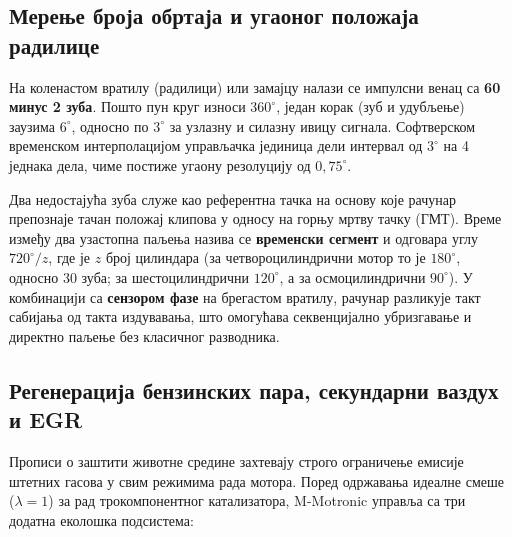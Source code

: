 \documentclass[12pt]{article}
\begin{document}
\subsection{Мерење броја обртаја и угаоног положаја радилице}

На коленастом вратилу (радилици) или замајцу налази се импулсни венац са
\textbf{60 минус 2 зуба}. Пошто пун круг износи $360^\circ$, један корак
(зуб и удубљење) заузима $6^\circ$, односно по $3^\circ$ за узлазну и силазну
ивицу сигнала. Софтверском временском интерполацијом управљачка јединица
дели интервал од $3^\circ$ на 4 једнака дела, чиме постиже угаону резолуцију
од $0,75^\circ$.

Два недостајућа зуба служе као референтна тачка на основу које рачунар
препознаје тачан положај клипова у односу на горњу мртву тачку (ГМТ). Време
између два узастопна паљења назива се \textbf{временски сегмент} и одговара
углу $720^\circ / z$, где је $z$ број цилиндара (за четвороцилиндрични мотор
то је $180^\circ$, односно 30 зуба; за шестоцилиндрични $120^\circ$, а за
осмоцилиндрични $90^\circ$). У комбинацији са \textbf{сензором фазе} на
брегастом вратилу, рачунар разликује такт сабијања од такта издувавања, што
омогућава секвенцијално убризгавање и директно паљење без класичног
разводника.

\subsection{Регенерација бензинских пара, секундарни ваздух и EGR}

Прописи о заштити животне средине захтевају строго ограничење емисије
штетних гасова у свим режимима рада мотора. Поред одржавања идеалне смеше
($\lambda = 1$) за рад трокомпонентног катализатора, M-Motronic управља са
три додатна еколошка подсистема:
\end{document}
